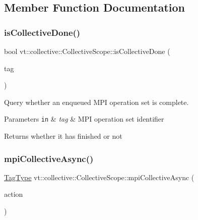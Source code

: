\subsection{Member Function Documentation}
\mbox{\label{structvt_1_1collective_1_1_collective_scope_acc386201ec9e82dbe2691b4ce528a4c2}} 
\subsubsection{\texorpdfstring{is\+Collective\+Done()}{isCollectiveDone()}}
{\footnotesize\ttfamily bool vt\+::collective\+::\+Collective\+Scope\+::is\+Collective\+Done (\begin{DoxyParamCaption}\item[{\hyperlink{namespacevt_a84ab281dae04a52a4b243d6bf62d0e52}{Tag\+Type}}]{tag }\end{DoxyParamCaption})}



Query whether an enqueued M\+PI operation set is complete. 


\begin{DoxyParams}[1]{Parameters}
\mbox{\tt in}  & {\em tag} & M\+PI operation set identifier\\
\hline
\end{DoxyParams}
\begin{DoxyReturn}{Returns}
whether it has finished or not 
\end{DoxyReturn}
\mbox{\label{structvt_1_1collective_1_1_collective_scope_ad116d0b00f28b79dbf7c4b0e5c4ed4a1}} 
\subsubsection{\texorpdfstring{mpi\+Collective\+Async()}{mpiCollectiveAsync()}}
{\footnotesize\ttfamily \hyperlink{namespacevt_a84ab281dae04a52a4b243d6bf62d0e52}{Tag\+Type} vt\+::collective\+::\+Collective\+Scope\+::mpi\+Collective\+Async (\begin{DoxyParamCaption}\item[{\hyperlink{namespacevt_ae0a5a7b18cc99d7b732cb4d44f46b0f3}{Action\+Type}}]{action }\end{DoxyParamCaption})}



